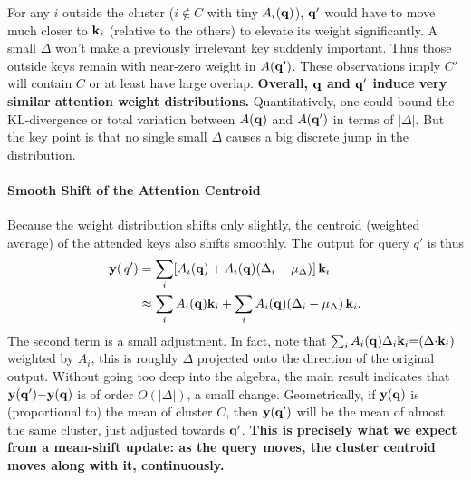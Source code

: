 For any $i$ outside the cluster ($i {\notin} C$ with tiny $A_i(\mathbf{q})$), $\mathbf{q}'$ would have to move much closer to $\mathbf{k}_i$ (relative to the others) to elevate its weight significantly. A small $\Delta$ won’t make a previously irrelevant key suddenly important. Thus those outside keys remain with near-zero weight in $A(\mathbf{q}')$. These observations imply $C'$ will contain $C$ or at least have large overlap. \textbf{Overall, $\mathbf{q}$ and $\mathbf{q}'$ induce very similar attention weight distributions.} Quantitatively, one could bound the KL-divergence or total variation between $A(\mathbf{q})$ and $A(\mathbf{q}')$ in terms of $|\Delta|$. But the key point is that no single small $\Delta$ causes a big discrete jump in the distribution.

\paragraph{Smooth Shift of the Attention Centroid} 

Because the weight distribution shifts only slightly, the centroid (weighted average) of the attended keys also shifts smoothly. The output for query $q'$ is thus
\begin{equation}
\begin{aligned}
    \mathbf{y}(\,q') &= \sum_i [A_i(\mathbf{q}) + A_i(\mathbf{q})(\Delta_i - \mu_\Delta)]\, \mathbf{k}_i \\
    &\approx \sum_i A_i(\mathbf{q}) \mathbf{k}_i + \sum_i A_i(\mathbf{q})(\Delta_i - \mu_\Delta)\,\mathbf{k}_i.
\end{aligned}
\end{equation}
The second term is a small adjustment. In fact, note that $\sum_i A_i(\mathbf{q})\Delta_i \mathbf{k}_i {=} (\Delta {\cdot} \mathbf{k}_i)$ weighted by $A_i$, this is roughly $\Delta$ projected onto the direction of the original output. Without going too deep into the algebra, the main result indicates that $\mathbf{y}(\mathbf{q}') {-} \mathbf{y}(\mathbf{q})$ is of order $O(|\Delta|)$, a small change. Geometrically, if $\mathbf{y}(\mathbf{q})$ is (proportional to) the mean of cluster $C$, then $\mathbf{y}(\mathbf{q}')$ will be the mean of almost the same cluster, just adjusted towards $\mathbf{q}'$. \textbf{This is precisely what we expect from a mean-shift update: as the query moves, the cluster centroid moves along with it, continuously.}




